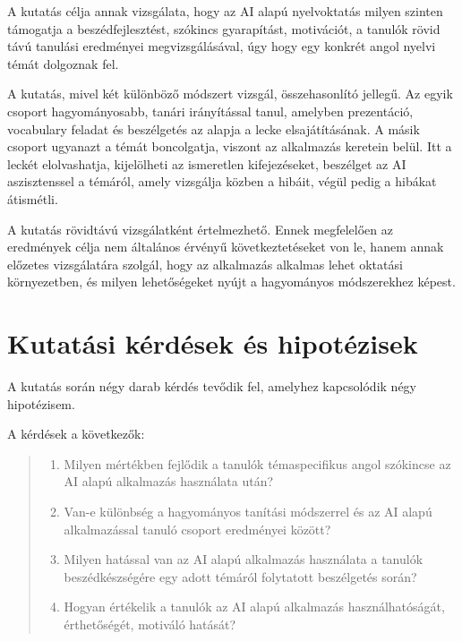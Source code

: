 A kutatás célja annak vizsgálata, hogy az AI alapú nyelvoktatás milyen szinten támogatja a beszédfejlesztést, szókincs gyarapítást, motivációt, a tanulók rövid távú tanulási eredményei megvizsgálásával, úgy hogy egy konkrét angol nyelvi témát dolgoznak fel. 

A kutatás, mivel két különböző módszert vizsgál, összehasonlító jellegű. Az egyik csoport hagyományosabb, tanári irányítással tanul, amelyben prezentáció, vocabulary feladat és beszélgetés az alapja a lecke elsajátításának. A másik csoport ugyanazt a témát boncolgatja, viszont az alkalmazás keretein belül. Itt a leckét elolvashatja, kijelölheti az ismeretlen kifejezéseket, beszélget az AI aszisztenssel a témáról, amely vizsgálja közben a hibáit, végül pedig a hibákat átismétli.

A kutatás rövidtávú vizsgálatként értelmezhető. Ennek megfelelően az eredmények célja nem általános érvényű következtetéseket von le, hanem annak előzetes vizsgálatára szolgál, hogy az alkalmazás alkalmas lehet oktatási környezetben, és milyen lehetőségeket nyújt a hagyományos módszerekhez képest.

\section{Kutatási kérdések és hipotézisek}

A kutatás során négy darab kérdés tevődik fel, amelyhez kapcsolódik négy hipotézisem.

A kérdések a következők:
\begin{quote}
\begin{enumerate}
    \item Milyen mértékben fejlődik a tanulók témaspecifikus angol szókincse az AI alapú alkalmazás használata után?
    \item Van-e különbség a hagyományos tanítási módszerrel és az AI alapú alkalmazással tanuló csoport eredményei között?
    \item Milyen hatással van az AI alapú alkalmazás használata a tanulók beszédkészségére egy adott témáról folytatott beszélgetés során?
    \item Hogyan értékelik a tanulók az AI alapú alkalmazás használhatóságát, érthetőségét, motiváló hatását?
\end{enumerate}
\end{quote}

